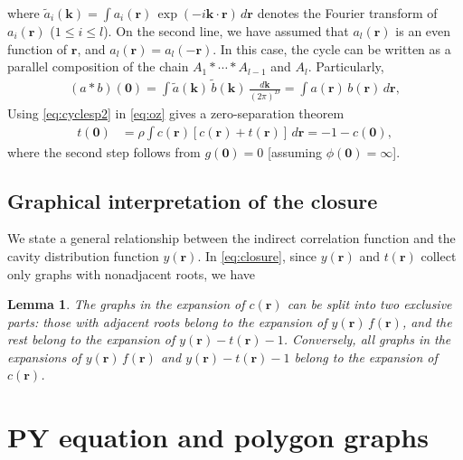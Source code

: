 \documentclass[preprint]{revtex4-1}
\newtheorem{lemm}[thrm]{Lemma}
\newcommand{\vct}[1]{\mathbf{#1}}
\providecommand{\vr}{} %
\renewcommand{\vr}{\vct{r}}
\newcommand{\vk}{\vct{k}}
\newcommand{\dvk}{\frac{d\vk}{(2\pi)^D}}
\begin{document}
%
where
  $\tilde{a}_i(\vk) = \int a_i(\vr) \, \exp(-i \vk \cdot \vr) \, d\vr$
  denotes the Fourier transform of $a_i(\vr)$ ($1 \le i \le l$).
%
On the second line,
  we have assumed that
  $a_l(\vr)$ is an even function of $\vr$,
  and
  $a_l(\vr) = a_l(-\vr)$.
%
In this case,
  the cycle can be written as a parallel composition
  of the chain $A_1 * \cdots * A_{l-1}$ and $A_l$.
%
Particularly,
%
\begin{align}
      (a * b)(\vct{0})
  =
      \int \tilde{a}(\vk) \, \tilde{b}(\vk) \, \dvk
  =
      \int a(\vr) \, b(\vr) \, d\vr,
\label{eq:cyclesp2}
\end{align}
%
Using \eqref{eq:cyclesp2} in \eqref{eq:oz} gives
  a zero-separation theorem\cite{rosenfeld1978}
%
\begin{align}
  t(\vct{0})
  &= \rho \int c(\vr) [c(\vr) + t(\vr)] \, d\vr
  = -1 - c(\vct{0}),
\label{eq:zerosep}
\end{align}
%
where the second step follows from
  $g(\vct{0}) = 0$ [assuming $\phi(\vct{0}) = \infty$].





\subsection{Graphical interpretation of the closure}



We state a general relationship between the indirect correlation function
  and the cavity distribution function $y(\vr)$.
%
In \eqref{eq:closure},
since $y(\vr)$ and $t(\vr)$
collect only graphs with nonadjacent roots,
we have
%
\begin{lemm}
The graphs in the expansion of $c(\vr)$
  can be split into two exclusive parts:
  those with adjacent roots belong to
  the expansion of $y(\vr)\, f(\vr)$,
  and the rest belong to
  the expansion of $y(\vr) - t(\vr) - 1$.
Conversely,
  all graphs in the expansions of $y(\vr) \, f(\vr)$
  and $y(\vr) - t(\vr) - 1$ belong to
  the expansion of $c(\vr)$.
\label{thm:crsplit}
\end{lemm}
%





\section{\label{sec:py}PY equation and polygon graphs}
\end{document}
